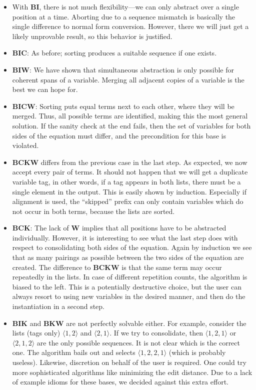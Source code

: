 \begin{itemize}
\item With $\mathbf{BI}$, there is not much flexibility---we can only abstract
	over a single position at a time.
	Aborting due to a sequence mismatch is basically the single difference to
	normal form conversion.
	However, there we will just get a likely unprovable result, so this
	behavior is justified.
\item $\mathbf{BIC}$: As before; sorting produces a suitable sequence if one
	exists.
\item $\mathbf{BIW}$: We have shown that simultaneous abstraction is only
	possible for coherent spans of a variable.
	Merging all adjacent copies of a variable is the best we can hope for.
\item $\mathbf{BICW}$: Sorting puts equal terms next to each other, where they
	will be merged.
	Thus, all possible terms are identified, making this the most general
	solution.
	If the sanity check at the end fails, then the set of variables for both
	sides of the equation must differ, and the precondition for this base is
	violated. %
\item $\mathbf{BCKW}$ differs from the previous case in the last step.
	As expected, we now accept every pair of terms.
	It should not happen that we will get a duplicate variable tag, in other words,
	if a tag appears in both lists, there must be a single element in the output.
	This is easily shown by induction.
	Especially if alignment is used, the ``skipped'' prefix can only contain
	variables which do not occur in both terms, because the lists are sorted.
\item $\mathbf{BCK}$: The lack of $\mathbf{W}$ implies that all positions
	have to be abstracted individually.
	However, it is interesting to see what the last step does with respect to
	consolidating both sides of the equation.
	Again by induction we see that as many pairings as possible between the
	two sides of the equation are created.
	The difference to $\mathbf{BCKW}$ is that the same term may occur repeatedly
	in the lists.
	In case of different repetition counts, the algorithm is biased to the left.
	This is a potentially destructive choice, but the user can always resort
	to using new variables in the desired manner, and then do the instantiation
	in a second step.
\item $\mathbf{BIK}$ and $\mathbf{BKW}$ are not perfectly solvable either.
	For example, consider the lists (tags only) $\langle 1,2\rangle$ and $\langle 2,1\rangle$.
	If we try to consolidate, then $\langle 1,2,1\rangle$ or $\langle 2,1,2\rangle$
	are the only possible sequences.
	It is not clear which is the correct one.
	The algorithm bails out and selects $\langle 1,2,2,1\rangle$ (which is
	probably useless).
	Likewise, discretion on behalf of the user is required.
	One could try more sophisticated algorithms like minimizing the edit
	distance.
	Due to a lack of example idioms for these bases, we decided against this
	extra effort.
\end{itemize}

